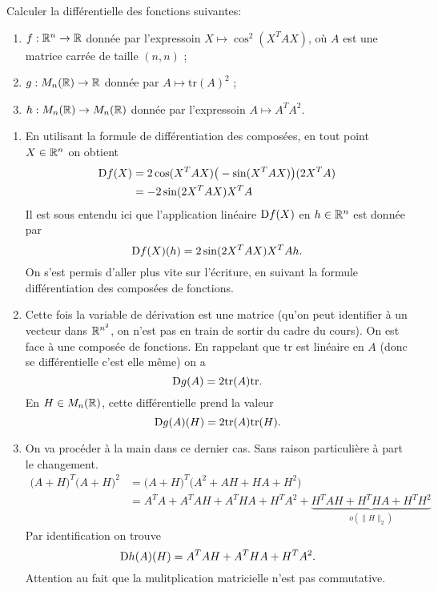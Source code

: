 \documentclass[11pt, a4paper]{article}
\begin{document}
\begin{question}
  Calculer la différentielle des fonctions suivantes:
  \begin{enumerate}
  \item $f : \mathbb{R}^n \rightarrow \mathbb{R}$ donnée par l'expressoin
    $X \mapsto \cos^2(X^TAX)$, où $A$ est une matrice carrée de taille
    $(n, n)$ ;
  \item $g : M_n(\mathbb{R}) \rightarrow \mathbb{R}$ donnée par
    $A \mapsto \mathrm{tr}(A)^2$ ;
  \item $h : M_n(\mathbb{R}) \rightarrow M_n(\mathbb{R})$ donnée par l'expressoin
    $A \mapsto A^TA^2$.
  \end{enumerate}
\end{question}

\begin{solution}
  \begin{enumerate}
  \item En utilisant la formule de différentiation des composées, en
    tout point $X \in \mathbb{R}^n$ on obtient
    \begin{align}
    \operatorname{D\!}{f}(X) & = 2\cos(X^TAX)\big(-\sin(X^TAX)\big)(2X^TA) \\
              & = -2\sin(2X^TAX)X^TA
    \end{align}
    Il est sous entendu ici que l'application linéaire $\operatorname{D\!}{f}(X)$ en
    $h \in \mathbb{R}^n$ est donnée par
    \[
    \operatorname{D\!}{f}(X)(h) = 2\sin(2X^TAX)X^TAh.
    \]
    On s'est permis d'aller plus vite sur l'écriture, en suivant la
    formule différentiation des composées de fonctions.
  \item Cette fois la variable de dérivation est une matrice (qu'on
    peut identifier à un vecteur dans $\mathbb{R}^{n^2}$, on n'est pas en
    train de sortir du cadre du cours). On est face à une composée de
    fonctions. En rappelant que $\mathrm{tr}$ est linéaire en $A$
    (donc se différentielle c'est elle même) on a
    \[
    \operatorname{D\!}{g}(A) = 2\mathrm{tr}(A)\mathrm{tr}. 
    \]
    En $H\in M_n(\mathbb{R})$, cette différentielle prend la valeur
    \[
    \operatorname{D\!}{g}(A)(H) = 2\mathrm{tr}(A)\mathrm{tr}(H). 
    \]
  \item On va procéder à la main dans ce dernier cas. Sans raison
    particulière à part le changement.
    \begin{align}
      \big(A+H\big)^T\big(A+H\big)^2 & = \big(A+H\big)^T\big(A^2 + AH + HA + H^2) \\
                                     & = A^TA + A^TAH + A^THA + H^TA^2 + \underbrace{H^TAH + H^THA + H^TH^2}_{o(\|H\|_2)}
    \end{align}
    Par identification on trouve
    \[
    \operatorname{D\!}{h}(A)(H) = A^TAH + A^THA + H^TA^2.
    \]
    Attention au fait que la mulitplication matricielle n'est pas commutative. 
  \end{enumerate}
\end{solution}
\end{document}
